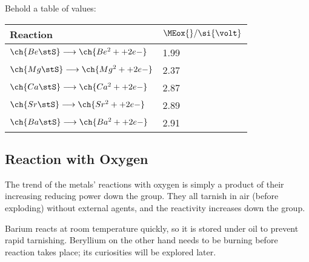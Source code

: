 			Behold a table of \Eox{} values:

			\begin{table}[htb]\renewcommand{\arraystretch}{1.5}\begin{center}
			\begin{tabu} to 0.6\textwidth {X[c,m] | X[c,m]}

				Reaction                                            &   $\MEox{} / \si{\volt}$              \\  \hline
				$\ch{Be \stS} \longrightarrow \ch{Be^2+ + 2 e-}$    &   \num[retain-explicit-plus]{+1.99}   \\
				$\ch{Mg \stS} \longrightarrow \ch{Mg^2+ + 2 e-}$    &   \num[retain-explicit-plus]{+2.37}   \\
				$\ch{Ca \stS} \longrightarrow \ch{Ca^2+ + 2 e-}$    &   \num[retain-explicit-plus]{+2.87}   \\
				$\ch{Sr \stS} \longrightarrow \ch{Sr^2+ + 2 e-}$    &   \num[retain-explicit-plus]{+2.89}   \\
				$\ch{Ba \stS} \longrightarrow \ch{Ba^2+ + 2 e-}$    &   \num[retain-explicit-plus]{+2.91}   \\


			\end{tabu}\end{center}
			\end{table}\vspace{-1em}



		\subsection{Reaction with Oxygen}

			The trend of the metals' reactions with oxygen is simply a product of their increasing reducing power down the group. They all
			tarnish in air (before exploding) without external agents, and the reactivity increases down the group.


			Barium reacts at room temperature quickly, so it is stored under oil to prevent rapid tarnishing. Beryllium on the other hand needs
			to be burning before  reaction takes place; its curiosities will be explored later.


